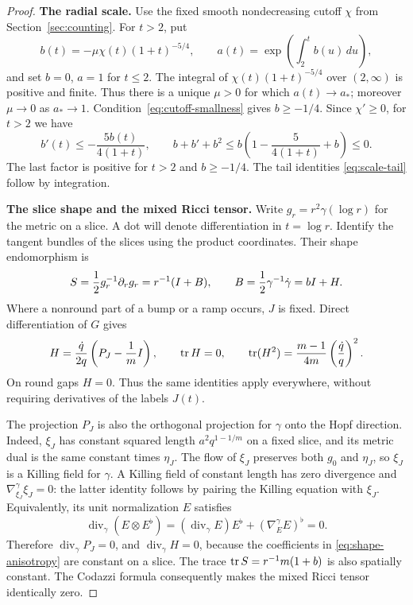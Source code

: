 \begin{proof}
\textbf{The radial scale.}
Use the fixed smooth nondecreasing cutoff \(\chi\) from
Section~\ref{sec:counting}.
For \(t>2\), put
\[
 b(t)=-\mu\chi(t)(1+t)^{-5/4},\qquad
 a(t)=\exp\left(\int_2^t b(u)\,du\right),
\]
and set \(b=0\), \(a=1\) for \(t\leq2\).
The integral of \(\chi(t)(1+t)^{-5/4}\) over \((2,\infty)\) is
positive and finite.  Thus there is a unique \(\mu>0\) for which
\(a(t)\to a_*\); moreover \(\mu\to0\) as \(a_*\to1\).
Condition~\eqref{eq:cutoff-smallness} gives \(b\geq-1/4\).
Since \(\chi'\geq0\), for \(t>2\) we have
\[
 b'(t)\leq-\frac{5b(t)}{4(1+t)},\qquad
 b+b'+b^2
 \leq b\left(1-\frac{5}{4(1+t)}+b\right)\leq0.
\]
The last factor is positive for \(t>2\) and \(b\geq-1/4\).
The tail identities \eqref{eq:scale-tail} follow by integration.

\medskip\noindent
\textbf{The slice shape and the mixed Ricci tensor.}
Write \(g_r=r^2\gamma(\log r)\) for the metric on a slice.
A dot will denote differentiation in \(t=\log r\).
Identify the tangent bundles of the slices using the product
coordinates.  Their shape endomorphism is
\[
 S=\frac12 g_r^{-1}\partial_r g_r
   =r^{-1}(I+B),\qquad
 B=\frac12\gamma^{-1}\dot\gamma=bI+H.
\]
Where a nonround part of a bump or a ramp occurs, \(J\) is fixed.
Direct differentiation of \(G\) gives
\begin{equation}\label{eq:shape-anisotropy}
 H=\frac{\dot q}{2q}\left(P_J-\frac1mI\right),\qquad
 \operatorname{tr} H=0,\qquad
 \operatorname{tr}(H^2)=\frac{m-1}{4m}\left(\frac{\dot q}{q}\right)^2.
\end{equation}
On round gaps \(H=0\).  Thus the same identities apply everywhere,
without requiring derivatives of the labels \(J(t)\).

The projection \(P_J\) is also the orthogonal projection for
\(\gamma\) onto the Hopf direction.
Indeed, \(\xi_J\) has constant squared length
\(a^2q^{1-1/m}\) on a fixed slice, and its metric dual is the same
constant times \(\eta_J\).
The flow of \(\xi_J\) preserves both \(g_0\) and \(\eta_J\), so
\(\xi_J\) is a Killing field for \(\gamma\).
A Killing field of constant length has zero divergence and
\(\nabla^\gamma_{\xi_J}\xi_J=0\): the latter identity follows by
pairing the Killing equation with \(\xi_J\).
Equivalently, its unit normalization \(E\) satisfies
\[
 \operatorname{div}_\gamma(E\otimes E^\flat)
    =(\operatorname{div}_\gamma E)E^\flat
      +(\nabla^\gamma_EE)^\flat=0.
\]
Therefore \(\operatorname{div}_\gamma P_J=0\), and
\(\operatorname{div}_\gamma H=0\), because the coefficients in
\eqref{eq:shape-anisotropy} are constant on a slice.
The trace \(\operatorname{tr} S=r^{-1}m(1+b)\) is also spatially constant.
The Codazzi formula consequently makes the mixed Ricci tensor
identically zero.


\end{proof}
